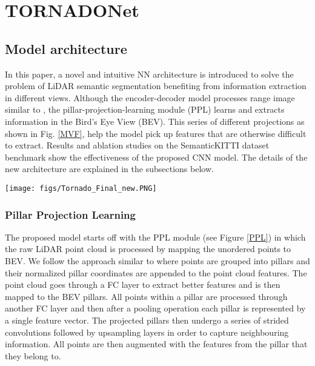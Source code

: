 \documentclass{article}
\begin{document}
\section{TORNADONet}
\label{sec:citations}
 \subsection{Model architecture}


 In this paper, a novel and intuitive NN architecture is introduced to solve the problem of LiDAR semantic segmentation benefiting from information extraction in different views. Although the encoder-decoder model processes range image similar to \cite{cortinhal2020salsanext}, the pillar-projection-learning module (PPL) learns and extracts information in the Bird's Eye View (BEV). This series of different projections as shown in Fig. \ref{MVF}, help the model pick up features that are otherwise difficult to extract. Results and ablation studies on the SemanticKITTI \cite{DBLP:conf/iccv/BehleyGMQBSG19} dataset benchmark show the effectiveness of the proposed CNN model.
 The details of the new architecture are explained in the subsections below.


 \begin{figure*}[!htbp]
    \centering
    \texttt{[image: figs/Tornado\_Final\_new.PNG]}
    \caption[Tornado]{TORNADO Architecture.}
    \label{MVF}
\end{figure*}

 \subsubsection{Pillar Projection Learning}
 The proposed model starts off with the PPL module (see Figure \ref{PPL}) in which the raw LiDAR point cloud  is processed by mapping the unordered points to BEV. We follow the approach similar to \cite{zhou2019endtoend} where points are grouped into pillars and their normalized  pillar coordinates are appended to the point cloud features. The point cloud goes through a FC layer to extract better features and is then mapped to the BEV pillars. All points within a pillar are processed through another FC layer and then after a pooling operation each pillar is represented by a single feature vector. The projected pillars then undergo a series of strided convolutions followed by upsampling layers in order to capture neighbouring information. All points are then augmented with the features from the pillar that they belong to.
 
\end{document}
